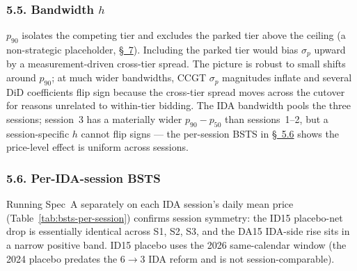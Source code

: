 \documentclass[11pt]{article}
\begin{document}
\subsubsection*{5.5. Bandwidth $h$}\label{sec:5e}
$p_{90}$ isolates the competing tier and excludes the parked tier above the ceiling (a non-strategic placeholder, \hyperref[sec:context]{\S~7}). Including the parked tier would bias $\sigma_p$ upward by a measurement-driven cross-tier spread. The picture is robust to small shifts around $p_{90}$; at much wider bandwidths, CCGT $\sigma_p$ magnitudes inflate and several DiD coefficients flip sign because the cross-tier spread moves across the cutover for reasons unrelated to within-tier bidding. The IDA bandwidth pools the three sessions; session~3 has a materially wider $p_{90}-p_{50}$ than sessions~1--2, but a session-specific $h$ cannot flip signs --- the per-session BSTS in \hyperref[sec:5f]{\S~5.6} shows the price-level effect is uniform across sessions.

\subsubsection*{5.6. Per-IDA-session BSTS}\label{sec:5f}
Running Spec~A separately on each IDA session's daily mean price (Table~\ref{tab:bsts-per-session}) confirms session symmetry: the ID15 placebo-net drop is essentially identical across S1, S2, S3, and the DA15 IDA-side rise sits in a narrow positive band. ID15 placebo uses the 2026 same-calendar window (the 2024 placebo predates the 6$\to$3 IDA reform and is not session-comparable).
\end{document}
